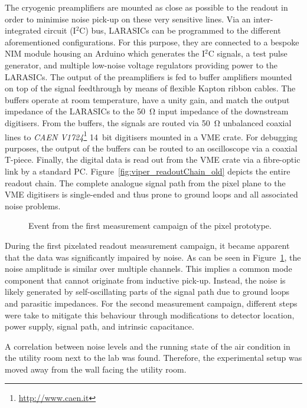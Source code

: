 The cryogenic preamplifiers are mounted as close as possible to the readout in order to minimise noise pick-up on these very sensitive lines.
Via an inter-integrated circuit (I$^2$C) bus, LARASICs can be programmed to the different aforementioned configurations.
For this purpose, they are connected to a bespoke NIM module housing an Arduino which generates the I$^2$C signals, a test pulse generator, and multiple low-noise voltage regulators providing power to the LARASICs.
The output of the preamplifiers is fed to buffer amplifiers mounted on top of the signal feedthrough by means of flexible Kapton ribbon cables.
The buffers operate at room temperature, have a unity gain, and match the output impedance of the LARASICs to the \SI{50}{\ohm} input impedance of the downstream digitisers.
From the buffers, the signals are routed via \SI{50}{\ohm} unbalanced coaxial lines to \emph{CAEN V1724}\footnote{\url{http://www.caen.it}} \SI{14}{bit} digitisers mounted in a VME crate.
For debugging purposes, the output of the buffers can be routed to an oscilloscope via a coaxial T-piece.
Finally, the digital data is read out from the VME crate via a fibre-optic link by a standard PC.
Figure~\ref{fig:viper_readoutChain_old} depicts the entire readout chain.
The complete analogue signal path from the pixel plane to the VME digitisers is single-ended and thus prone to ground loops and all associated noise problems.

\begin{figure}[htb]
	\centering
	\caption{Event from the first measurement campaign of the pixel prototype.}
	\label{fig:viper_noisy-event}
\end{figure}

During the first pixelated readout measurement campaign, it became apparent that the data was significantly impaired by noise.
As can be seen in Figure~\ref{fig:viper_noisy-event}, the noise amplitude is similar over multiple channels.
This implies a common mode component that cannot originate from inductive pick-up.
Instead, the noise is likely generated by self-oscillating parts of the signal path due to ground loops and parasitic impedances.
For the second measurement campaign, different steps were take to mitigate this behaviour through modifications to detector location, power supply, signal path, and intrinsic capacitance.

A correlation between noise levels and the running state of the air condition in the utility room next to the lab was found.
Therefore, the experimental setup was moved away from the wall facing the utility room.

